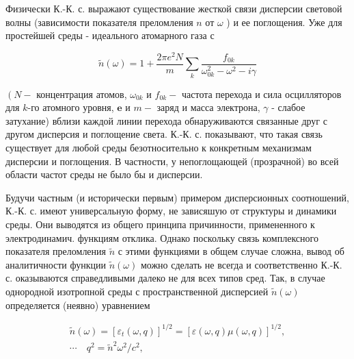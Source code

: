 \documentclass[10pt]{article}
\begin{document}
Физически К.-К. с. выражают существование жесткой связи дисперсии световой волны (зависимости показателя преломления $n$ от $\omega$ ) и ее поглощения. Уже для простейшей среды - идеального атомарного газа с



\[

\tilde{n}(\omega)=1+\frac{2 \pi e^{2} N}{m} \sum_{k} \frac{f_{0 k}}{\omega_{0 k}^{2}-\omega^{2}-i \gamma}

\]



$\left(N-\right.$ концентрация атомов, $\omega_{0 k}$ и $f_{0 k}-$ частота перехода и сила осцилляторов для $k$-го атомного уровня, $\boldsymbol{e}$ и $m-$ заряд и масса электрона, $\gamma$ - слабое затухание) вблизи каждой линии перехода обнаруживаются связанные друг с другом дисперсия и поглощение света. К.-К. с. показывают, что такая связь существует для любой среды безотносительно к конкретным механизмам дисперсии и поглощения. В частности, у непоглощающей (прозрачной) во всей области частот среды не было бы и дисперсии.



Будучи частным (и исторически первым) примером дисперсионных соотношений, К.-К. с. имеют универсальную форму, не зависяшую от структуры и динамики среды. Они выводятся из общего принципа причинности, примененного к электродинамич. функциям отклика. Однако поскольку связь комплексного показателя преломления $\widetilde{n}$ с этими функциями в общем случае сложна, вывод об аналитичности функции $\widetilde{n}(\omega)$ можно сделать не всегда и соответственно К.-К. с. оказываются справедливыми далеко не для всех типов сред. Так, в случае однородной изотропной среды с пространственной дисперсией $\widetilde{n}(\omega)$ определяется (неявно) уравнением



\[

\begin{gathered}

\tilde{n}(\omega)=\left[\varepsilon_{t}(\omega, q)\right]^{1 / 2}=[\varepsilon(\omega, q) \mu(\omega, q)]^{1 / 2}, \\

\cdots \quad q^{2}=\tilde{n}^{2} \omega^{2} / c^{2},

\end{gathered}

\]
\end{document}
